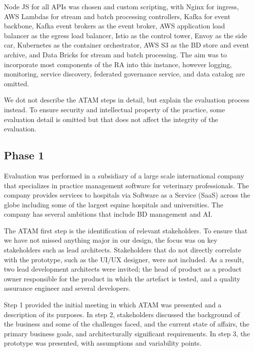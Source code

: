 \documentclass[a4paper,11pt]{article}
\begin{document}

Node JS for all APIs was chosen and custom scripting, with Nginx for ingress, AWS Lambdas for stream and batch processing controllers, Kafka for event backbone, Kafka event brokers as the event broker, AWS application load balancer as the egress load balancer, Istio as the control tower, Envoy as the side car, Kubernetes as the container orchestrator, AWS S3 as the BD store and event archive, and Data Bricks for stream and batch processing. The aim was to incorporate most components of the RA into this instance, however logging, monitoring, service discovery, federated governance service, and data catalog are omitted. 

We dot not describe the ATAM steps in detail, but explain the evaluation process instead. To ensure security and intellectual property of the practice, some evaluation detail is omitted but that does not affect the integrity of the evaluation.  

\subsection{Phase 1}
\nobreak{}
Evaluation was performed in a subsidiary of a large scale international company that specializes in practice management software for veterinary professionals. The company provides services to hospitals via Software as a Service (SaaS) across the globe including some of the largest equine hospitals and universities. The company has several ambitions that include BD management and AI. 

The ATAM first step is the identification of relevant stakeholders. To ensure that we have not missed anything major in our design, the focus was on key stakeholders such as lead architects. Stakeholders that do not directly correlate with the prototype, such as the UI/UX designer, were not included. As a result, two lead development architects were invited; the head of product as a product owner responsible for the product in which the artefact is tested, and a quality assurance engineer and several developers. 

Step 1 provided the initial meeting in which ATAM was presented and a description of its purposes. In step 2, stakeholders discussed the background of the business and some of the challenges faced, and the current state of affairs, the primary business goals, and architecturally significant requirements. In step 3, the prototype was presented, with assumptions and variability points. 
\end{document}
